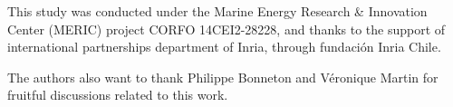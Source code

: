 \begin{acknowledgements}

\indent This study was conducted under the Marine Energy Research \& Innovation Center (MERIC) project CORFO 14CEI2-28228, and thanks to the support of international partnerships department of Inria, through fundación Inria Chile.

\indent The authors also want to thank Philippe Bonneton and Véronique Martin for fruitful discussions related to this work.

\end{acknowledgements}